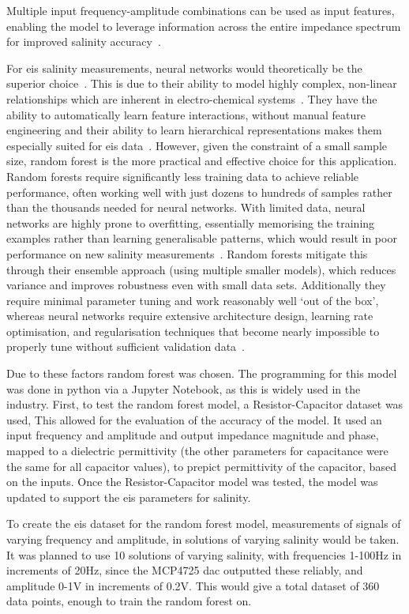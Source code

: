 Multiple input frequency-amplitude combinations can be used as input features, enabling the model to leverage information across the entire impedance spectrum for improved salinity accuracy~\cite{wang_deep_2024}.

For \gls{eis} salinity measurements, neural networks would theoretically be the superior choice~\cite{doonyapisut_analysis_2023}.
This is due to their ability to model highly complex, non-linear relationships which are inherent in electro-chemical systems~\cite{chen_intelligent_2025}.
They have the ability to automatically learn feature interactions, without manual feature engineering and their ability to learn hierarchical representations makes them especially suited for \gls{eis} data~\cite{doonyapisut_analysis_2023}.
However, given the constraint of a small sample size, random forest is the more practical and effective choice for this application.
Random forests require significantly less training data to achieve reliable performance, often working well with just dozens to hundreds of samples rather than the thousands needed for neural networks.
With limited data, neural networks are highly prone to overfitting, essentially memorising the training examples rather than learning generalisable patterns, which would result in poor performance on new salinity measurements~\cite{alwosheel_is_2018}.
Random forests mitigate this through their ensemble approach (using multiple smaller models), which reduces variance and improves robustness even with small data sets. 
Additionally they require minimal parameter tuning and work reasonably well `out of the box', whereas neural networks require extensive architecture design, learning rate optimisation, and regularisation techniques that become nearly impossible to properly tune without sufficient validation data~\cite{alwosheel_is_2018}.

Due to these factors random forest was chosen.
The programming for this model was done in python via a Jupyter Notebook, as this is widely used in the industry.
First, to test the random forest model, a Resistor-Capacitor dataset was used,
This allowed for the evaluation of the accuracy of the model.
It used an input frequency and amplitude and output impedance magnitude and phase, mapped to a dielectric permittivity (the other parameters for capacitance were the same for all capacitor values), to prepict permittivity of the capacitor, based on the inputs.
Once the Resistor-Capacitor model was tested, the model was updated to support the \gls{eis} parameters for salinity.

To create the \gls{eis} dataset for the random forest model, measurements of signals of varying frequency and amplitude, in solutions of varying salinity would be taken.
It was planned to use 10 solutions of varying salinity, with frequencies 1-100Hz in increments of 20Hz, since the MCP4725 \gls{dac} outputted these reliably, and amplitude 0-1V in increments of 0.2V.
This would give a total dataset of 360 data points, enough to train the random forest on.